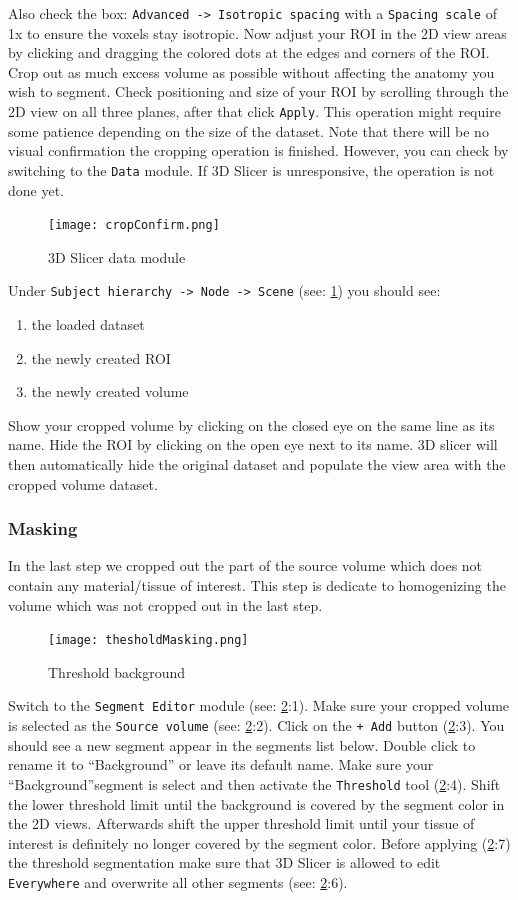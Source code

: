 Also check the box: \texttt{Advanced -> Isotropic spacing} with a \texttt{Spacing scale} of 1x to ensure the voxels stay isotropic.
Now adjust your ROI in the 2D view areas by clicking and dragging the colored dots at the edges and corners of the ROI.
Crop out as much excess volume as possible without affecting the anatomy you wish to segment.
Check positioning and size of your ROI by scrolling through the 2D view on all three planes, after that click \texttt{Apply}.
This operation might require some patience depending on the size of the dataset.
Note that there will be no visual confirmation the cropping operation is finished.
However, you can check by switching to the \texttt{Data} module.
If 3D Slicer is unresponsive, the operation is not done yet.
\begin{figure}[h!]
	\centerline{
		\texttt{[image: cropConfirm.png]}}
	  \caption{3D Slicer data module}
	  \label{fig:cC}
	\end{figure}
	\pagebreak
	\newline
Under \texttt{Subject hierarchy -> Node -> Scene} (see: \cref{fig:cC}) you should see:
\begin{enumerate}
  \item the loaded dataset
  \item the newly created ROI
  \item the newly created volume
\end{enumerate}
Show your cropped volume by clicking on the closed eye on the same line as its name. Hide the ROI by clicking on the open eye next to its name.
3D slicer will then automatically hide the original dataset and populate the view area with the cropped volume dataset.

\subsubsection{Masking}\label{mask}
In the last step we cropped out the part of the source volume which does not contain any material/tissue of interest.
This step is dedicate to homogenizing the volume which was not cropped out in the last step.
\begin{figure}[h!]
	\centerline{
		\texttt{[image: thesholdMasking.png]}}
	  \caption{Threshold background}
	  \label{fig:tM}
\end{figure}
Switch to the \texttt{Segment Editor} module (see: \cref{fig:tM}:1).
Make sure your cropped volume is selected as the \texttt{Source volume} (see: \cref{fig:tM}:2).
Click on the \texttt{+ Add} button (\cref{fig:tM}:3). You should see a new segment appear in the segments list below.
Double click to rename it to ``Background'' or leave its default name.
Make sure your ``Background''segment is select and then activate the \texttt{Threshold} tool (\cref{fig:tM}:4).
Shift the lower threshold limit until the background is covered by the segment color in the 2D views. Afterwards shift the upper threshold limit until your tissue of interest is definitely no longer covered by the segment color.
Before applying (\cref{fig:tM}:7) the threshold segmentation make sure that 3D Slicer is allowed to edit \texttt{Everywhere} and overwrite all other segments (see: \cref{fig:tM}:6).

